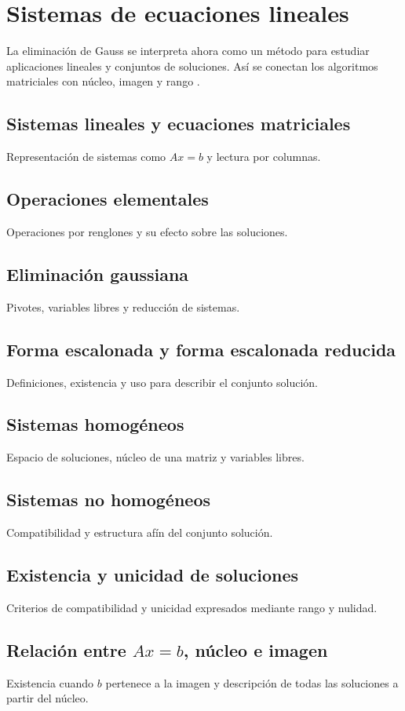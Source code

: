 \chapter{Sistemas de ecuaciones lineales}
\label{cap:sistemas}

La eliminación de Gauss se interpreta ahora como un método para estudiar aplicaciones lineales y conjuntos de soluciones. Así se conectan los algoritmos matriciales con núcleo, imagen y rango \cite{lang1986,hoffmankunze1971}.

\section{Sistemas lineales y ecuaciones matriciales}
Representación de sistemas como $Ax=b$ y lectura por columnas.

\section{Operaciones elementales}
Operaciones por renglones y su efecto sobre las soluciones.

\section{Eliminación gaussiana}
Pivotes, variables libres y reducción de sistemas.

\section{Forma escalonada y forma escalonada reducida}
Definiciones, existencia y uso para describir el conjunto solución.

\section{Sistemas homogéneos}
Espacio de soluciones, núcleo de una matriz y variables libres.

\section{Sistemas no homogéneos}
Compatibilidad y estructura afín del conjunto solución.

\section{Existencia y unicidad de soluciones}
Criterios de compatibilidad y unicidad expresados mediante rango y nulidad.

\section{Relación entre \texorpdfstring{$Ax=b$}{Ax=b}, núcleo e imagen}
Existencia cuando $b$ pertenece a la imagen y descripción de todas las soluciones a partir del núcleo.
